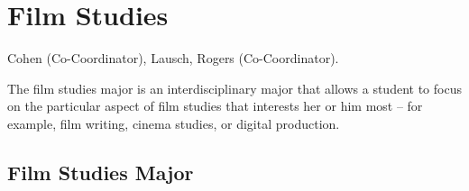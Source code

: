 \documentclass[
  letterpaper,
]{scrbook}
\begin{document}
\section{Film Studies}\label{sec-film-studies}

Cohen (Co-Coordinator), Lausch, Rogers (Co-Coordinator).

The film studies major is an interdisciplinary major that allows a
student to focus on the particular aspect of film studies that interests
her or him most -- for example, film writing, cinema studies, or digital
production.

\subsection{Film Studies Major}\label{film-studies-major}
\end{document}
